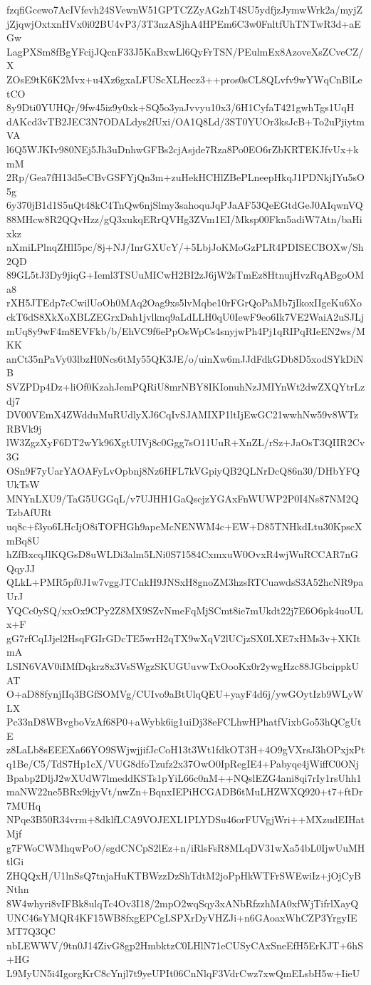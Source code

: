 fzqfiGcewo7AcIVfevh24SVewnW51GPTCZZyAGzhT4SU5ydfjzJymwWrk2a/myjZ
jZjqwjOxtxnHVx0i02BU4vP3/3T3nzASjhA4HPEm6C3w0FnltfUhTNTwR3d+aEGw
LagPXSm8fBgYFcijJQcnF33J5KaBxwLl6QyFrTSN/PEulmEx8AzoveXsZCveCZ/X
ZOsE9tK6K2Mvx+u4Xz6gxaLFUScXLHecz3++pros0sCL8QLvfv9wYWqCnBlLetCO
8y9Dti0YUHQr/9fw45iz9y0xk+SQ5o3yaJvvyu10x3/6H1CyfaT421gwhTgs1UqH
dAKcd3vTB2JEC3N7ODALdys2fUxi/OA1Q8Ld/3ST0YUOr3ksJcB+To2uPjiytmVA
l6Q5WJKIv980NEj5Jh3uDnhwGFBs2cjAsjde7Rza8Po0EO6rZbKRTEKJfvUx+kmM
2Rp/Gea7fH13d5eCBvGSFYjQn3m+zuHekHCHlZBePLneepHkqJ1PDNkjIYu5sO5g
6y370jB1d1S5uQt48kC4TnQw6njSlmy3sahoquJqPJaAF53QeEGtdGeJ0AIqwnVQ
88MHcw8R2QQvHzz/gQ3xukqERrQVHg3ZVm1EI/Mksp00Fkn5adiW7Atn/baHixkz
nXmiLPlnqZHlI5pc/8j+NJ/InrGXUcY/+5LbjJoKMoGzPLR4PDISECBOXw/Sh2QD
89GL5tJ3Dy9jiqG+Ieml3TSUuMICwH2BI2zJ6jW2sTmEz8HtnujHvzRqABgoOMa8
rXH5JTEdp7cCwilUoOh0MAq2Oag9xs5lvMqbe10rFGrQoPaMb7jIkoxIIgeKu6Xo
ckT6dS8XkXoXBLZEGrxDah1jvlknq9aLdLLH0qU0IewF9eo6Ik7VE2WaiA2uSJLj
mUq8y9wF4m8EVFkb/b/EhVC9f6ePpOsWpCs4snyjwPh4Pj1qRIPqRIeEN2ws/MKK
anCt35nPaVy03lbzH0Ncs6tMy55QK3JE/o/uinXw6mJJdFdkGDb8D5xodSYkDiNB
SVZPDp4Dz+liOf0KzahJemPQRiU8mrNBY8IKIonuhNzJMIYnWt2dwZXQYtrLzdj7
DV00VEmX4ZWdduMuRUdlyXJ6CqIvSJAMIXP1ltIjEwGC21wwhNw59v8WTzRBVk9j
lW3ZgzXyF6DT2wYk96XgtUIVj8c0Ggg7sO11UuR+XnZL/rSz+JaOsT3QIIR2Cv3G
OSn9F7yUarYAOAFyLvOpbnj8Nz6HFL7kVGpiyQB2QLNrDcQ86n30/DHbYFQUkTsW
MNYnLXU9/TaG5UGGqL/v7UJHH1GaQscjzYGAxFnWUWP2P0I4Ns87NM2QTzbAfURt
uq8c+f3yo6LHcIjO8iTOFHGh9apeMcNENWM4c+EW+D85TNHkdLtu30KpscXmBq8U
hZfBxcqJlKQGsD8uWLDi3alm5LNi0S71584CxmxuW0OvxR4wjWuRCCAR7nGQqyJJ
QLkL+PMR5pf0J1w7vggJTCnkH9JNSxH8gnoZM3hzsRTCuawdsS3A52hcNR9paUrJ
YQCc0ySQ/xxOx9CPy2Z8MX9SZvNmeFqMjSCmt8ie7mUkdt22j7E6O6pk4uoULx+F
gG7rfCqIJjel2HsqFGIrGDcTE5wrH2qTX9wXqV2lUCjzSX0LXE7xHMs3v+XKItmA
LSIN6VAV0iIMfDqkrz8x3VsSWgzSKUGUuvwTxOooKx0r2ywgHzc88JGbcippkUAT
O+aD88fynjIIq3BGfSOMVg/CUIvo9aBtUlqQEU+yayF4d6j/ywGOytIzb9WLyWLX
Pc33nD8WBvgboVzAf68P0+aWybk6ig1uiDj38eFCLhwHPhatfVixbGo53hQCgUtE
z8LaLb8sEEEXa66YO9SWjwjjifJcCoH13t3Wt1fdkOT3H+4O9gVXrsJ3hOPxjxPt
q1Be/C5/TdS7Hp1cX/VUG8dfoTzufz2x37OwO0IpRegIE4+Pabyqe4jWiffC0ONj
Bpabp2DljJ2wXUdW7lmeddKSTs1pYiL66c0nM++NQslEZG4ani8qi7rIy1rsUhh1
maNW22ne5BRx9kjyVt/nwZn+BqnxIEPiHCGADB6tMuLHZWXQ920+t7+ftDr7MUHq
NPqe3B50R34vrm+8dklfLCA9VOJEXL1PLYDSu46orFUVgjWri++MXzudEIHatMjf
g7FWoCWMhqwPoO/sgdCNCpS2lEz+n/iRlsFsR8MLqDV31wXa54bL0IjwUuMHtlGi
ZHQQxH/U1lnSsQ7tnjaHuKTBWzzDzShTdtM2joPpHkWTFrSWEwiIz+jOjCyBNthn
8W4whyri8vIFBk8ulqTc4Ov3I18/2mpO2wqSqy3xANbRfzzhMA0xfWjTifrlXayQ
UNC46sYMQR4KF15WB8fxgEPCgLSPXrDyVHZJi+n6GAoaxWhCZP3YrgyIEMT7Q3QC
nbLEWWV/9tn0J14ZivG8gp2HmbktzC0LHlN71eCUSyCAxSneEfH5ErKJT+6hS+HG
L9MyUN5i4IgorgKrC8cYnjl7t9yeUPIt06CnNlqF3VdrCwz7xwQmELsbH5w+IieU
